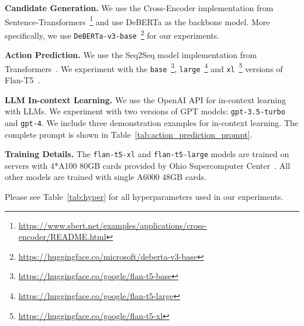\noindent\textbf{Candidate Generation.}
We use the Cross-Encoder implementation from Sentence-Transformers~\footnote{\url{https://www.sbert.net/examples/applications/cross-encoder/README.html}} and use DeBERTa as the backbone model. More specifically, we use \texttt{DeBERTa-v3-base}~\footnote{\url{https://huggingface.co/microsoft/deberta-v3-base}} for our experiments.

\noindent\textbf{Action Prediction.}
We use the Seq2Seq model implementation from Transformers~\cite{wolf-etal-2020-transformers}. We experiment with the \texttt{base}~\footnote{\url{https://huggingface.co/google/flan-t5-base}}, \texttt{large}~\footnote{\url{https://huggingface.co/google/flan-t5-large}} and \texttt{xl}~\footnote{\url{https://huggingface.co/google/flan-t5-xl}} versions of Flan-T5~\cite{flant5}.

\noindent\textbf{LLM In-context Learning.}
We use the OpenAI API for in-context learning with LLMs. We experiment with two versions of GPT models: \texttt{gpt-3.5-turbo} and \texttt{gpt-4}. We include three demonstration examples for in-context learning. The complete prompt is shown in Table~\ref{tab:action_prediction_prompt}.

\noindent\textbf{Training Details.}
The \texttt{flan-t5-xl} and \texttt{flan-t5-large} models are trained on servers with 4*A100 80GB cards provided by Ohio Supercomputer Center~\cite{OhioSupercomputerCenter1987}. All other models are trained with single A6000 48GB cards.

Please see Table~\ref{tab:hyper} for all hyperparameters used in our experiments.


